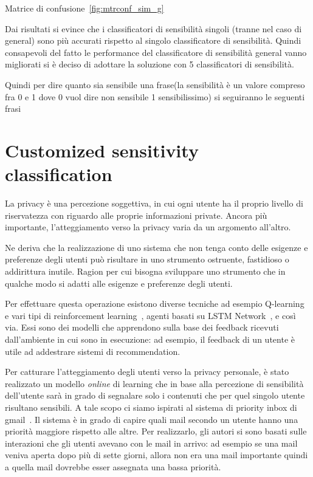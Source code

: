 Matrice di confusione~\ref{fig:mtrconf_sim_g}

Dai risultati si evince che i classificatori di sensibilità singoli (tranne nel caso di general) sono più accurati rispetto al singolo classificatore di sensibilità. Quindi consapevoli del fatto le performance del classificatore di sensibilità general vanno migliorati si è deciso di adottare la soluzione con 5 classificatori di sensibilità.

Quindi per dire quanto sia sensibile una frase(la sensibilità è un valore compreso fra 0 e 1 dove 0 vuol dire non sensibile 1 sensibilissimo) si seguiranno le seguenti frasi

\section{Customized sensitivity classification}
\label{sec:pres_sens_class}
La privacy è una percezione soggettiva, in cui ogni utente ha il proprio livello di riservatezza con riguardo alle proprie informazioni private. Ancora più importante, l'atteggiamento verso la privacy varia da un argomento all'altro. 

Ne deriva che la realizzazione di uno sistema che non tenga conto delle esigenze e preferenze degli utenti può risultare in uno strumento ostruente, fastidioso o addirittura inutile. Ragion per cui bisogna sviluppare uno strumento che in qualche modo si adatti alle esigenze e preferenze degli utenti. 

Per effettuare questa operazione esistono diverse tecniche ad esempio Q-learning~\cite{q-learning} e vari tipi di reinforcement learning~\cite{reinfoce-learn}, agenti basati su LSTM Network~\cite{lstm}, e così via. Essi sono dei modelli che apprendono sulla base dei feedback ricevuti dall'ambiente in cui sono in esecuzione: ad esempio, il feedback di un utente è utile ad addestrare sistemi di recommendation.

Per catturare l'atteggiamento degli utenti verso la privacy personale, è stato realizzato un modello \textit{online} di learning che in base alla percezione di sensibilità dell'utente sarà in grado di segnalare solo i contenuti che per quel singolo utente risultano sensibili.
A tale scopo ci siamo ispirati al sistema di priority inbox di gmail~\cite{inbox}.
Il sistema è in grado di capire quali mail secondo un utente hanno una priorità maggiore rispetto alle altre. Per realizzarlo, gli autori si sono basati sulle interazioni che gli utenti avevano con le mail in arrivo: ad esempio se una mail veniva aperta dopo più di sette giorni, allora non era una mail importante quindi a quella mail dovrebbe esser assegnata una bassa priorità.

